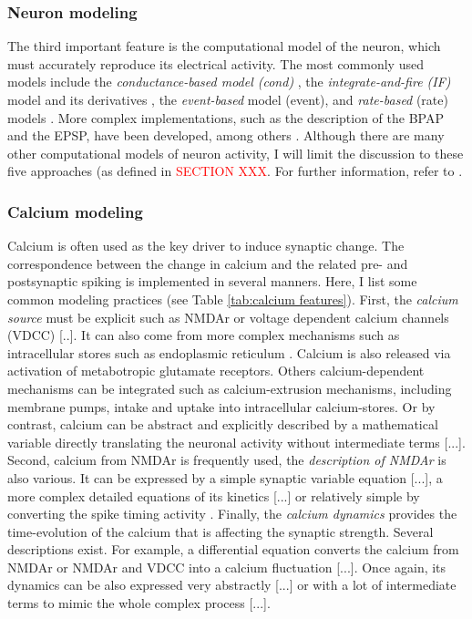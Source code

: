 \subsubsection{Neuron modeling}
The third important feature is the computational model of the neuron, which must accurately reproduce its electrical activity. The most commonly used models include the \textit{conductance-based model (cond)}   \citep{hartley_understanding_2006, gerkin_phenomenological_2010}, the \textit{integrate-and-fire (IF)} model and its derivatives \citep{bush_calcium_2012, izhikevich_solving_2007}, the \textit{event-based} model   (event)\citep{shouval_converging_2002}, and \textit{rate-based} (rate) models \citep{delamare_intrinsic_2022}. More complex implementations, such as the description of the \acrfull{BPAP} and the \acrfull{EPSP}, have been developed, among others \citep{kumar_frequency-dependent_2011}. Although there are many other computational models of neuron activity, I will limit the discussion to these five approaches (as defined in \textcolor{red}{SECTION XXX}. For further information, refer to \citep{gerstner_neuronal_2014}.



\subsubsection{Calcium modeling}
 Calcium is often used as the key driver to induce synaptic change. The correspondence between the change in calcium and the related pre- and postsynaptic spiking is implemented in several manners. Here, I list some common modeling practices (see Table \ref{tab:calcium features}). First, the \textit{calcium source} must be explicit such as NMDAr or voltage dependent calcium channels (VDCC) [..]. It can also come from more complex mechanisms such as intracellular stores such as endoplasmic reticulum \citep{berridge_neuronal_1998, jaeger_spike_2014}. Calcium is also released via activation of metabotropic glutamate receptors. Others calcium-dependent mechanisms can be integrated such as calcium-extrusion mechanisms, including membrane pumps, intake and uptake into intracellular calcium-stores. Or by contrast, calcium can be abstract and explicitly described by a mathematical variable directly translating the neuronal activity without intermediate terms [...].  Second, calcium from NMDAr is frequently used, the \textit{description of NMDAr} is also various. It can be expressed by a simple synaptic variable equation [...], a more complex detailed equations of its kinetics [...] or relatively simple by converting the spike timing activity \citep{jaeger_spike_2014}. Finally, the \textit{calcium dynamics} provides the time-evolution of the calcium that is affecting the synaptic strength. Several descriptions exist. For example, a differential equation converts the calcium from NMDAr or NMDAr and VDCC into a calcium fluctuation [...]. Once again, its dynamics can be also expressed very abstractly [...] or with a lot of intermediate terms to mimic the whole complex process [...].


